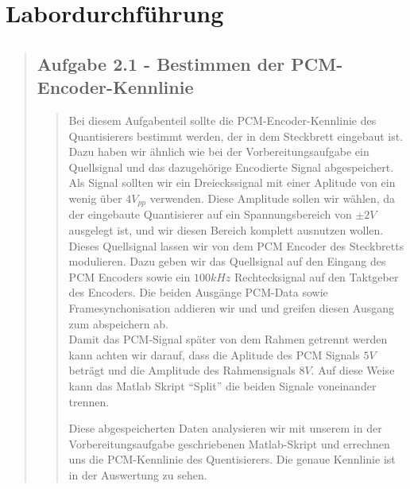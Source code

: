 \section{Labordurchführung}
\begin{quote}

    \subsection{Aufgabe 2.1 - Bestimmen der PCM-Encoder-Kennlinie}
    \begin{quote}
         
         Bei diesem Aufgabenteil sollte die PCM-Encoder-Kennlinie des Quantisierers bestimmt werden, der in dem
         Steckbrett eingebaut ist. Dazu haben wir ähnlich wie bei der Vorbereitungsaufgabe ein Quellsignal und das
         dazugehörige Encodierte Signal abgespeichert.\\
         Als Signal sollten wir ein Dreieckssignal mit einer Aplitude von ein wenig über $4 V_{pp}$ verwenden. Diese
         Amplitude sollen wir wählen, da der eingebaute Quantisierer auf ein Spannungsbereich von $\pm 2 V$ ausgelegt
         ist, und wir diesen Bereich komplett ausnutzen wollen.\\
         Dieses Quellsignal lassen wir von dem PCM Encoder des Steckbretts modulieren. Dazu geben wir das Quellsignal
         auf den Eingang des PCM Encoders sowie ein $100 kHz$ Rechtecksignal auf den Taktgeber des Encoders. Die beiden
         Ausgänge PCM-Data sowie Framesynchonisation addieren wir und und greifen diesen Ausgang zum abspeichern ab.\\
         Damit das PCM-Signal später von dem Rahmen getrennt werden kann achten wir darauf, dass die Aplitude des PCM
         Signals $5 V$ beträgt und die Amplitude des Rahmensignals $8 V$. Auf diese Weise kann das Matlab Skript
         ``Split'' die beiden Signale voneinander trennen.
         
         Diese abgespeicherten Daten analysieren wir mit unserem in der Vorbereitungsaufgabe geschriebenen Matlab-Skript
         und errechnen uns die PCM-Kennlinie des Quentisierers. Die genaue Kennlinie ist in der Auswertung zu
         sehen.\vspace{1em}
         

\end{quote}
\end{quote}
